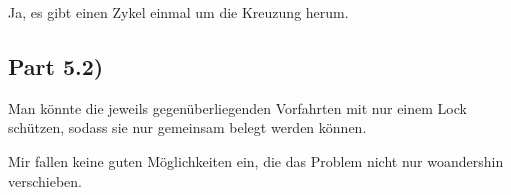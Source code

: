\documentclass[10pt,a4paper]{article}
\begin{document}
Ja, es gibt einen Zykel einmal um die Kreuzung herum.

\subsection*{Part 5.2)}

Man könnte die jeweils gegenüberliegenden Vorfahrten mit nur einem Lock schützen, sodass sie nur gemeinsam belegt werden können.

Mir fallen keine guten Möglichkeiten ein, die das Problem nicht nur woandershin verschieben.
\end{document}
